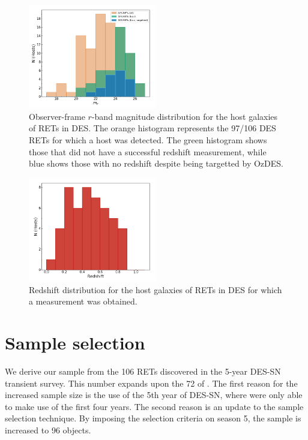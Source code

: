 \documentclass[fleqn,usenatbib,]{mnras}
\begin{document}
\begin{figure}
\includegraphics[width=0.5\textwidth]{figs/mag_dist.png}
\caption{Observer-frame $r$-band magnitude distribution for the host galaxies of RETs in DES. The orange histogram represents the 97/106 DES RETs for which a host was detected. The green histogram shows those that did not have a successful redshift measurement, while blue shows those with no redshift despite being targetted by OzDES.
\label{fig:mag_dist}}
\end{figure}

\begin{figure}
\includegraphics[width=0.5\textwidth]{figs/z_dist.png}
\caption{Redshift distribution for the host galaxies of RETs in DES for which a measurement was obtained.
\label{fig:z_dist}}
\end{figure}

\section{Sample selection\label{sec:sample}}

We derive our sample from the 106 RETs discovered in the 5-year DES-SN transient survey. This number expands upon the 72 of . The first reason for the increased sample size is the use of the 5th year of DES-SN, where  were only able to make use of the first four years. The second reason is an update to the sample selection technique. By imposing the  selection criteria on season 5, the sample is increased to 96 objects.
\end{document}

